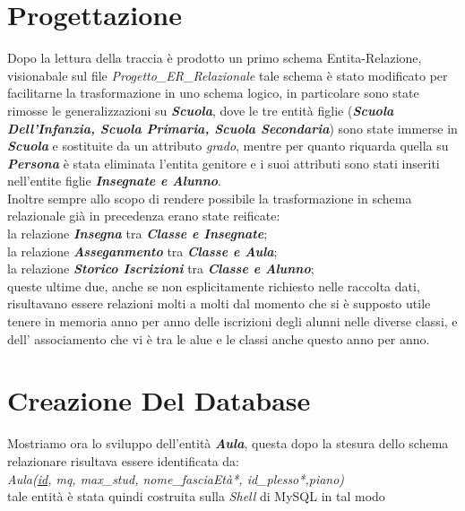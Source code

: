 \documentclass{article}
\begin{document}
\section{Progettazione}
Dopo la lettura della traccia è prodotto un primo schema Entita-Relazione, visionabale sul file \textit{Progetto\_ER\_Relazionale} tale schema è stato modificato per facilitarne la trasformazione in uno schema logico, in particolare sono state rimosse le generalizzazioni su \textit{\textbf{Scuola}}, dove le tre entità figlie (\textit{\textbf{Scuola Dell'Infanzia, Scuola Primaria, Scuola Secondaria}}) sono state immerse in \textit{\textbf{Scuola}} e sostituite da un attributo \textit{grado}, mentre per quanto riquarda quella su \textit{\textbf{Persona}} è stata eliminata l’entita genitore e i suoi attributi sono stati inseriti nell’entite figlie \textit{\textbf{Insegnate e Alunno}}. \\
Inoltre sempre allo scopo di rendere possibile la trasformazione in schema relazionale già in precedenza erano state reificate:\\
\indent la relazione \textit{\textbf{Insegna}} tra \textit{\textbf{Classe e Insegnate}};\\
\indent la relazione \textit{\textbf{Asseganmento}} tra \textit{\textbf{Classe e Aula}};\\
\indent la relazione \textit{\textbf{Storico Iscrizioni}} tra \textit{\textbf{Classe e Alunno}};\\
queste ultime due, anche se non esplicitamente richiesto nelle raccolta dati, risultavano essere relazioni molti a molti dal momento che si è supposto utile tenere in memoria anno per anno delle iscrizioni degli alunni nelle diverse classi, e dell' associamento che vi è tra le alue e le classi anche questo anno per anno.

\section{Creazione Del Database}
Mostriamo ora lo sviluppo dell'entità \textit{\textbf{Aula}}, questa dopo la stesura dello schema relazionare risultava essere identificata da:\\
\indent \textit{Aula(\underline{id}, mq, max\_stud, nome\_fasciaEtà*, id\_plesso*,piano)}\\
tale entità è stata quindi costruita sulla \textit{Shell} di MySQL in tal modo

\vspace{0.5 cm}
    

\end{document}
